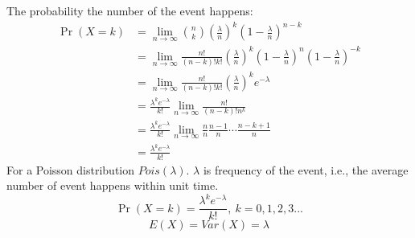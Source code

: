\documentclass[11pt]{elegantbook}
\begin{document}
The probability the number of the event happens:
\begin{equation}
    \begin{aligned}
        \Pr(X=k)&=\lim_{n \rightarrow\infty} \binom{n}{k} (\frac{\lambda}{n})^k(1-\frac{\lambda}{n})^{n-k}\\
        &=\lim_{n \rightarrow\infty} \frac{n!}{(n-k)!k!} (\frac{\lambda}{n})^k(1-\frac{\lambda}{n})^{n}(1-\frac{\lambda}{n})^{-k}\\
        &=\lim_{n \rightarrow\infty}\frac{n!}{(n-k)!k!} (\frac{\lambda}{n})^k e^{-\lambda}\\
        &=\frac{\lambda^k e^{-\lambda}}{k!}\lim_{n \rightarrow\infty}\frac{n!}{(n-k)!n^k}\\
        &=\frac{\lambda^k e^{-\lambda}}{k!}\lim_{n \rightarrow\infty}
        \frac{n}{n}\frac{n-1}{n}\cdots \frac{n-k+1}{n}\\
        &=\frac{\lambda^k e^{-\lambda}}{k!}
    \end{aligned}
    \nonumber
\end{equation}
For a Poisson distribution $Pois(\lambda)$. $\lambda$ is frequency of the event, i.e., the average number of event happens within unit time.
$$\Pr(X{=}k)= \frac{\lambda^k e^{-\lambda}}{k!},\ k=0,1,2,3...$$
$$E(X)=Var(X)=\lambda$$
\end{document}

